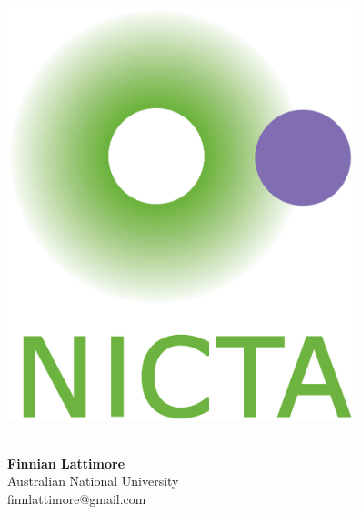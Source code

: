 \documentclass[b0,landscape,25pt]{sciposter}
\begin{document}
\def\ci{\perp\!\!\!\perp}

\begin{minipage}[t]{0.15\linewidth}%
\centering
\includegraphics[height=12cm]{nicta_logo2.jpg} %
\end{minipage}
\begin{minipage}[b]{0.65\linewidth}
\centering
{}
 \color{Black}\\ 

\huge \textbf{Finnian Lattimore}\\ %
\huge Australian National University\\ %
finnlattimore@gmail.com

\end{minipage}
\end{document}
